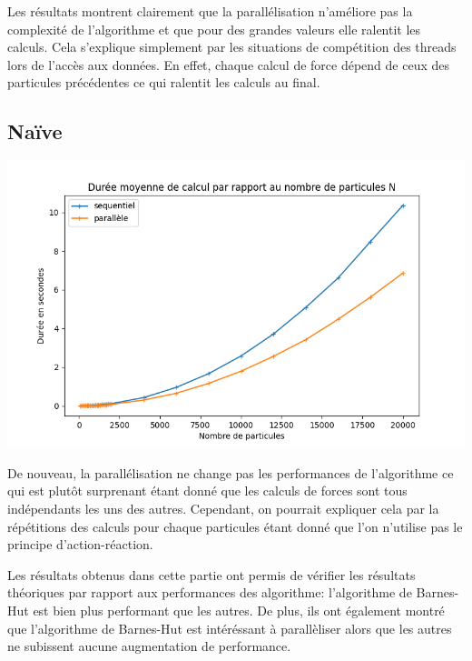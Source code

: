 Les résultats montrent clairement que la parallélisation n'améliore pas la complexité de l'algorithme et que pour des grandes valeurs elle ralentit les calculs.
Cela s'explique simplement par les situations de compétition des threads lors de l'accès aux données. En effet, chaque calcul de force dépend de ceux des particules précédentes ce qui ralentit les calculs au final.

\subsection{Naïve}
\begin{center}
\includegraphics[scale=0.6]{./resultats/comparison_N.png}
\captionsetup{hypcap=false}
\label{fig13}
\end{center}


De nouveau, la parallélisation ne change pas les performances de l'algorithme ce qui est plutôt surprenant étant donné que les calculs de forces sont tous indépendants les uns des autres.
Cependant, on pourrait expliquer cela par la répétitions des calculs pour chaque particules étant donné que l'on n'utilise pas le principe d'action-réaction.

\vspace{2mm}


Les résultats obtenus dans cette partie ont permis de vérifier les résultats théoriques par rapport aux performances des algorithme: l'algorithme de Barnes-Hut est bien plus performant que les autres. De plus, ils ont également montré que l'algorithme de Barnes-Hut est intéréssant à parallèliser alors que les autres ne subissent aucune augmentation de performance.